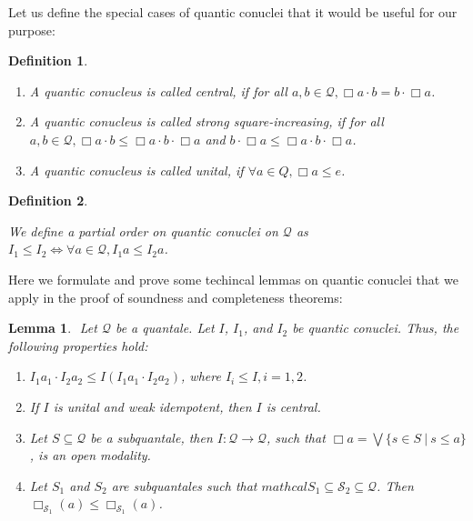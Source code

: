 \documentclass[a4paper]{article}
\theoremstyle{defin}
\newtheorem{defin}{Definition}
\theoremstyle{theorem}
\theoremstyle{prop}
\theoremstyle{lemma}
\newtheorem{lemma}{Lemma}
\theoremstyle{ex}
\theoremstyle{col}
\begin{document}
Let us define the special cases of quantic conuclei that it would be useful for our purpose:

\begin{defin}
$ $
\begin{enumerate}
  \item A quantic conucleus is called central, if for all
  $a, b \in \mathcal{Q}, \Box a \cdot b = b \cdot \Box a$.

  \item A quantic conucleus is called strong square-increasing,
  if for all $a, b \in \mathcal{Q}, \Box a \cdot b \leq \Box a \cdot b \cdot \Box a$ and
  $b \cdot \Box a \leq \Box a \cdot b \cdot \Box a$.

  \item A quantic conucleus is called unital, if $\forall a \in Q, \Box a \leq e$.
\end{enumerate}
\end{defin}

\begin{defin}
$ $

  We define a partial order on quantic conuclei on $\mathcal{Q}$ as
  $I_1 \leq I_2 \Leftrightarrow \forall a \in \mathcal{Q}, I_1 a \leq I_2 a$.
\end{defin}

Here we formulate and prove some techincal lemmas on quantic conuclei that we apply in the proof of soundness and completeness theorems:

\begin{lemma}
  $ $
  Let $\mathcal{Q}$ be a quantale. Let $I$, $I_1$, and $I_2$ be quantic conuclei. Thus, the following properties hold:
  \begin{enumerate}
  \item $I_1 a_1 \cdot I_2 a_2 \leq I (I_1 a_1 \cdot I_2 a_2)$, where $I_i \leq I, i = 1,2$.
  \item If $I$ is unital and weak idempotent, then $I$ is central.
  \item Let $S \subseteq \mathcal{Q}$ be a subquantale, then $I : \mathcal{Q} \to \mathcal{Q}$, such that $\Box a = \bigvee \{ s \in S \: | \: s \leq a \}$, is an open modality.
  \item Let $S_1$ and $S_2$ are subquantales such that $mathcal{S}_1 \subseteq \mathcal{S}_2 \subseteq \mathcal{Q}$. Then $\Box_{\mathcal{S}_1} (a) \leq \Box_{\mathcal{S}_1} (a)$.
  \end{enumerate}
\end{lemma}
\end{document}
